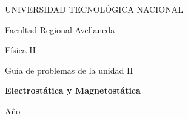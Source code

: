 \begin{titlepage}
    \begin{center}
    \vspace{1.5cm}
    

    \end{center}

    \begin{center}
        {\LARGE UNIVERSIDAD TECNOLÓGICA NACIONAL}\par\medskip
        \vspace*{0.25cm}
        {\LARGE Facultad Regional Avellaneda}\par\medskip
        \vspace*{1cm}
        {\Huge Física II - \comision}\par\medskip
        \vspace*{0.5cm}
        {\LARGE Guía de problemas de la unidad II}\par\bigskip
        \vspace*{1cm}
        {\Huge \bf \color[RGB]{0,121,138} Electrostática y Magnetostática\par\medskip}
    \end{center}

    \vspace{1cm}

    \begin{center}
        \begin{minipage}[t]{.7\textwidth}
            \renewcommand*{\contentsname}{Contenidos}
            \tableofcontents
        \end{minipage}
        \vspace*{\fill}
    \end{center}
    \begin{center}
        Año \anio
    \end{center}

\end{titlepage}

\newpage
{}
